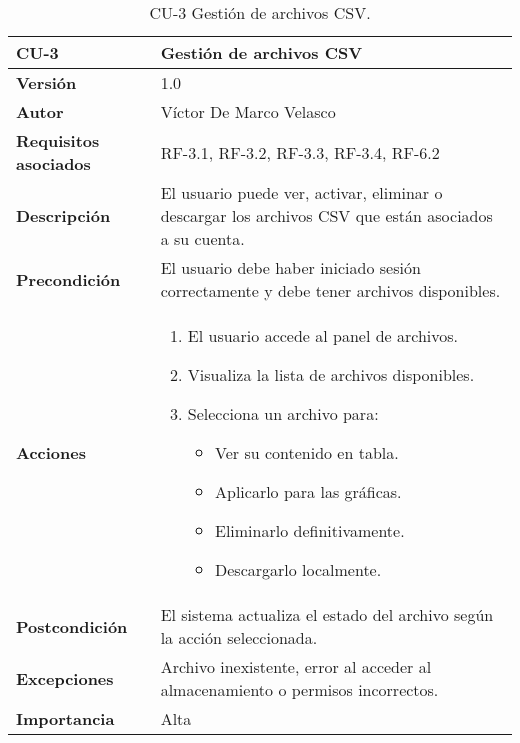 \begin{table}[p]
	\centering
	\begin{tabularx}{\linewidth}{ p{} p{} }
		\toprule
		\textbf{CU-3}    & Gestión de archivos CSV \\
		\toprule
		\textbf{Versión}              & 1.0 \\
		\textbf{Autor}                & Víctor De Marco Velasco \\
		\textbf{Requisitos asociados} & RF-3.1, RF-3.2, RF-3.3, RF-3.4, RF-6.2 \\
		\textbf{Descripción}          & El usuario puede ver, activar, eliminar o descargar los archivos CSV que están asociados a su cuenta. \\
		\textbf{Precondición}         & El usuario debe haber iniciado sesión correctamente y debe tener archivos disponibles. \\
		\textbf{Acciones}             &
		\begin{enumerate}
			\item El usuario accede al panel de archivos.
			\item Visualiza la lista de archivos disponibles.
			\item Selecciona un archivo para:
			\begin{itemize}
				\item Ver su contenido en tabla.
				\item Aplicarlo para las gráficas.
				\item Eliminarlo definitivamente.
				\item Descargarlo localmente.
			\end{itemize}
		\end{enumerate}\\
		\textbf{Postcondición}        & El sistema actualiza el estado del archivo según la acción seleccionada. \\
		\textbf{Excepciones}          & Archivo inexistente, error al acceder al almacenamiento o permisos incorrectos. \\
		\textbf{Importancia}          & Alta \\
		\bottomrule
	\end{tabularx}
	\caption{CU-3 Gestión de archivos CSV.}
\end{table}

